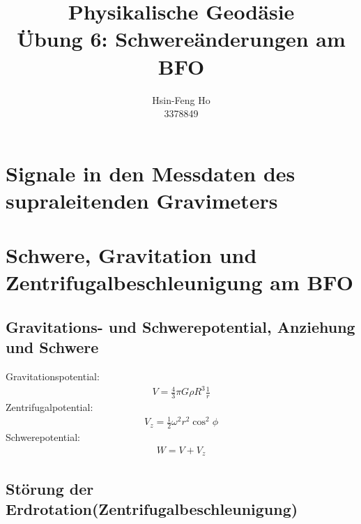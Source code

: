 \documentclass[12pt
,headinclude
,headsepline
,bibtotocnumbered
]{scrartcl}
\begin{document}
	\begin{titlepage}
		\vspace{\fill}
		\title{\textbf{Physikalische Geodäsie \\ Übung 6: Schwereänderungen am BFO}}
		\vspace{5cm}
		\author{Hsin-Feng Ho\\
			3378849}
		\vspace{3cm}
		\maketitle
	\end{titlepage}
	\section{Signale in den Messdaten des supraleitenden Gravimeters}
	\section{Schwere, Gravitation und Zentrifugalbeschleunigung am BFO}
	\subsection{Gravitations- und Schwerepotential, Anziehung und Schwere}
	Gravitationspotential:
	\begin{align*}
		V=\frac{4}{3}\pi G\rho R^3\frac{1}{r}
	\end{align*}
	Zentrifugalpotential:
	\begin{align*}
		V_z=\frac{1}{2}\omega^2r^2\cos^2\phi
	\end{align*}
	Schwerepotential:
	\begin{align*}
		W=V+V_z
	\end{align*}
	\subsection{Störung der Erdrotation(Zentrifugalbeschleunigung)}
\end{document}
